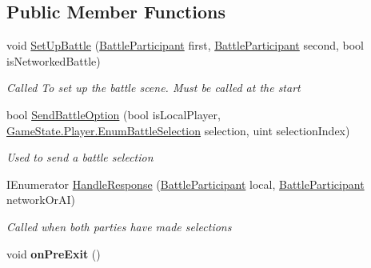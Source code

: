\subsection*{Public Member Functions}
\begin{DoxyCompactItemize}
\item 
void \hyperlink{class_battle_handler_a380a371e96df1b362027a8f33c8ed7fb}{Set\-Up\-Battle} (\hyperlink{class_battle_participant}{Battle\-Participant} first, \hyperlink{class_battle_participant}{Battle\-Participant} second, bool is\-Networked\-Battle)
\begin{DoxyCompactList}\small\item\em Called To set up the battle scene. Must be called at the start \end{DoxyCompactList}\item 
bool \hyperlink{class_battle_handler_ad207e2adf6f1f3882e98b1c8a5f59f67}{Send\-Battle\-Option} (bool is\-Local\-Player, \hyperlink{class_game_state_1_1_player_a9f54c5eca1e60acbaa2074e981f51615}{Game\-State.\-Player.\-Enum\-Battle\-Selection} selection, uint selection\-Index)
\begin{DoxyCompactList}\small\item\em Used to send a battle selection \end{DoxyCompactList}\item 
I\-Enumerator \hyperlink{class_battle_handler_a25e3f172c7752e64dec1834f88055ad4}{Handle\-Response} (\hyperlink{class_battle_participant}{Battle\-Participant} local, \hyperlink{class_battle_participant}{Battle\-Participant} network\-Or\-A\-I)
\begin{DoxyCompactList}\small\item\em Called when both parties have made selections \end{DoxyCompactList}\item 
\hypertarget{class_battle_handler_a13610e1414fd1f866292588574c96139}{void {\bfseries on\-Pre\-Exit} ()}\label{class_battle_handler_a13610e1414fd1f866292588574c96139}

\end{DoxyCompactItemize}
